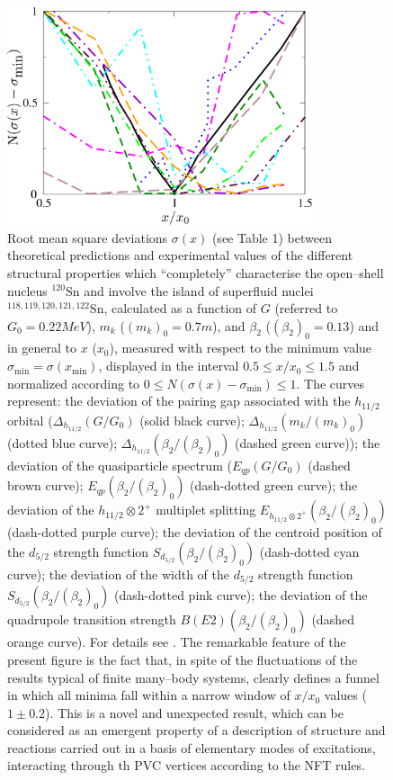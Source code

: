 \begin{figure}
\begin{center}
\includegraphics[width=0.8\textwidth]{introduccion/figs/funnel_norm_tot_try.pdf}
\caption{
Root mean square deviations $\sigma(x)$ (see Table 1) between theoretical predictions and experimental values of the different structural properties which ``completely'' characterise the open--shell nucleus $^{120}$Sn and involve the island of superfluid nuclei $^{118,119,120,121,122}$Sn, calculated as a function of $G$ (referred to $G_0 = 0.22 MeV$), $m_k$ ($(m_k)_0 = 0.7 m$), and $\beta_2$ ($(\beta_{2})_0 = 0.13$)  and in general to $x$ ($x_0$), measured with respect to the minimum value $\sigma_{\textrm{min}} = \sigma (x_{\textrm{min}})$, displayed in the interval $0.5 \leq x/x_0 \leq 1.5$ and normalized according to $0 \leq N(\sigma(x) - \sigma_{\textrm{min}}) \leq 1$.
The  curves represent: the deviation of the  pairing gap associated with the $h_{11/2}$ orbital 
($\Delta_{h_{11/2}} (G/G_0)$ (solid black curve);  
$\Delta_{h_{11/2}} (m_k/(m_k)_0)$ (dotted blue curve);  $\Delta_{h_{11/2}} (\beta_{2}/(\beta_{2})_0)$ (dashed green curve));
the deviation of the quasiparticle spectrum ($E_{qp}(G/G_0)$ (dashed brown curve);  $E_{qp}(\beta_{2}/(\beta_{2})_0)$ (dash-dotted green curve);
the deviation of the $h_{11/2}\otimes 2^+$ multiplet splitting  $E_{h_{11/2}\otimes 2^+}(\beta_{2}/(\beta_{2})_0)$ (dash-dotted purple curve); 
the deviation of the  centroid position of the $d_{5/2}$ strength function $S_{d_{5/2}}(\beta_{2}/(\beta_{2})_0)$ (dash-dotted cyan curve); 
the deviation of the width of the $d_{5/2}$ strength function  $S_{d_{5/2}} (\beta_{2}/(\beta_{2})_0)$ (dash-dotted pink curve);
the deviation  of the  quadrupole transition strength  $B(E2) (\beta_{2}/(\beta_{2})_0)$ (dashed orange curve). For details see \cite{Idini:15}.
The remarkable feature of the present figure is the fact that, in spite of the fluctuations of the results typical of finite  many--body systems, clearly defines a funnel in which all minima fall within a narrow window of $x/x_0$ values ($1 \pm 0.2$). This is a novel and unexpected result, which can be considered as an emergent property of a description of structure and reactions carried out in a basis of elementary modes of excitations, interacting through th PVC vertices according to the NFT rules.}\label{fig1.4.1x}
\end{center}
\end{figure}

